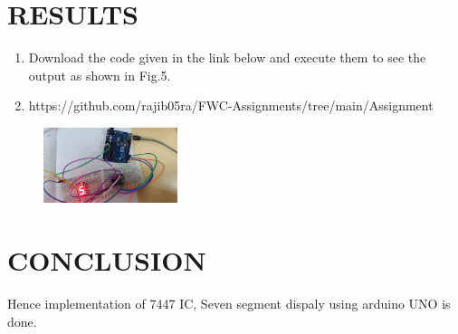 \documentclass[conference]{IEEEtran}
\begin{document}
\section{RESULTS}
 \begin{enumerate}
         \item Download the code given in the link below and execute them to see the output as shown in Fig.5.
         \item https://github.com/rajib05ra/FWC-Assignments/tree/main/Assignment
 \end{enumerate}
        \begin{figure}[h]
        \centering
        \includegraphics[width=0.35\textwidth]{bcdr.jpg}                                                     \caption{\label{fig:Gates}}
\end{figure}
\section{CONCLUSION}
Hence implementation of 7447 IC, Seven segment dispaly using arduino UNO is done.
\end{document}
